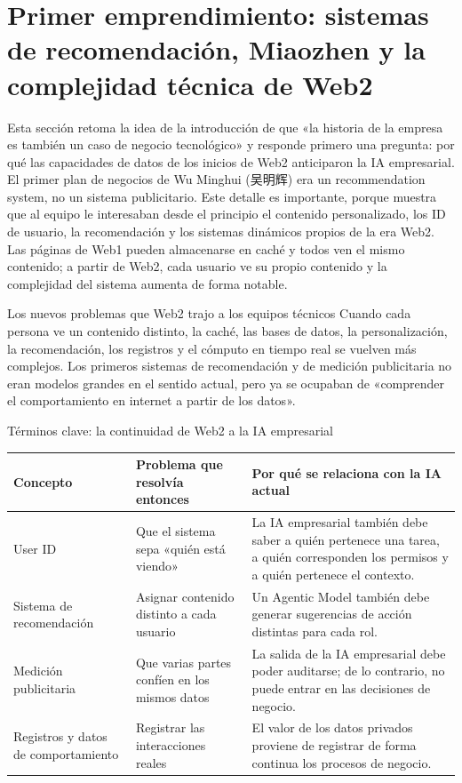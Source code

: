 \section{Primer emprendimiento: sistemas de recomendación, Miaozhen y la complejidad técnica de Web2}

Esta sección retoma la idea de la introducción de que «la historia de la empresa es también un caso de negocio tecnológico» y responde primero una pregunta: por qué las capacidades de datos de los inicios de Web2 anticiparon la IA empresarial. El primer plan de negocios de Wu Minghui (吴明辉) era un recommendation system, no un sistema publicitario. Este detalle es importante, porque muestra que al equipo le interesaban desde el principio el contenido personalizado, los ID de usuario, la recomendación y los sistemas dinámicos propios de la era Web2. Las páginas de Web1 pueden almacenarse en caché y todos ven el mismo contenido; a partir de Web2, cada usuario ve su propio contenido y la complejidad del sistema aumenta de forma notable.

\begin{importantbox}{Los nuevos problemas que Web2 trajo a los equipos técnicos}
Cuando cada persona ve un contenido distinto, la caché, las bases de datos, la personalización, la recomendación, los registros y el cómputo en tiempo real se vuelven más complejos. Los primeros sistemas de recomendación y de medición publicitaria no eran modelos grandes en el sentido actual, pero ya se ocupaban de «comprender el comportamiento en internet a partir de los datos».
\end{importantbox}

\begin{knowledgebox}{Términos clave: la continuidad de Web2 a la IA empresarial}
\begin{tabularx}{\textwidth}{p{}p{}X}
\toprule
Concepto & Problema que resolvía entonces & Por qué se relaciona con la IA actual \\
\midrule
User ID & Que el sistema sepa «quién está viendo» & La IA empresarial también debe saber a quién pertenece una tarea, a quién corresponden los permisos y a quién pertenece el contexto. \\
Sistema de recomendación & Asignar contenido distinto a cada usuario & Un Agentic Model también debe generar sugerencias de acción distintas para cada rol. \\
Medición publicitaria & Que varias partes confíen en los mismos datos & La salida de la IA empresarial debe poder auditarse; de lo contrario, no puede entrar en las decisiones de negocio. \\
Registros y datos de comportamiento & Registrar las interacciones reales & El valor de los datos privados proviene de registrar de forma continua los procesos de negocio. \\
\bottomrule
\end{tabularx}
\end{knowledgebox}

